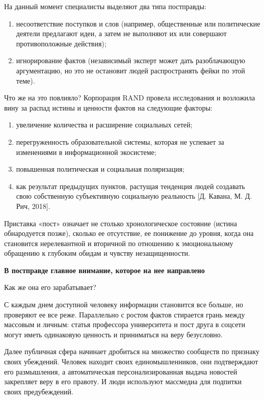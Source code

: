 На данный момент специалисты выделяют два типа постправды:

\begin{enumerate}
    \item несоответствие поступков и слов (например, общественные или политические деятели предлагают идеи, а затем не выполняют их или совершают противоположные действия);
    \item игнорирование фактов (независимый эксперт может дать разоблачающую аргументацию, но это не остановит людей распространять фейки по этой теме).
\end{enumerate}

Что же на это повлияло? Корпорация RAND провела исследования и возложила вину за распад истины и ценности фактов на следующие факторы:

\begin{enumerate}
    \item увеличение количества и расширение социальных сетей;
    \item перегруженность образовательной системы, которая не успевает за изменениями в информационной экосистеме;
    \item повышенная политическая и социальная поляризация;
    \item как результат предыдущих пунктов, растущая тенденция людей создавать свою собственную субъективную социальную реальность [Д. Кавана, М. Д. Рич, 2018].
\end{enumerate}

Приставка «пост» означает не столько хронологическое состояние (истина обнародуется позже), сколько ее отсутствие, ее понижение до уровня, когда она становится нерелевантной и вторичной по отношению к эмоциональному обращению к глубоким обидам и чувству незащищенности.

\textbf{В постправде главное внимание, которое на нее направлено}

Как же она его зарабатывает?

С каждым днем доступной человеку информации становится все больше, но проверяют ее все реже. Параллельно с ростом фактов стирается грань между массовым и личным: статья профессора университета и пост друга в соцсети могут иметь одинаковую ценность и приниматься на веру безусловно.

Далее публичная сфера начинает дробиться на множество сообществ по признаку своих убеждений. Человек находит своих единомышленников, они подтверждают его размышления, а автоматическая персонализированная выдача новостей закрепляет веру в его правоту. И люди используют массмедиа для подпитки своих предубеждений.

